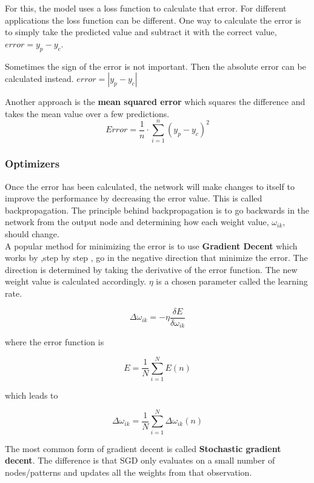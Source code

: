 For this, the model uses a loss function to calculate that error. For different applications the loss function can be different.
One way to calculate the error is to simply take the predicted value and subtract it with the correct value, $ error = y_p - y_c $.

Sometimes the sign of the error is not important. Then the absolute error can be calculated instead. $error = |y_p - y_c| $

Another approach is the \textbf{mean squared error} which squares the difference and takes the mean value over a few predictions.
\[Error = \frac{1}{n} \cdot \displaystyle\sum_{i=1}^{n} (y_p - y_c)^{2} \]


\subsubsection{Optimizers}
Once the error has been calculated, the network will make changes to itself to improve the performance by decreasing the error value. This is called backpropagation.
The principle behind backpropagation is to go backwards in the network from the output node and determining how each weight value, $ \omega_{ik} $, should change.\\

A popular method for minimizing the error is to use \textbf{Gradient Decent} which works by ,step by step , go in the negative direction that minimize the error.
The direction is determined by taking the derivative of the error function.
The new weight value is calculated accordingly. $\eta$ is a chosen parameter called the learning rate.

\[ \Delta \omega_{ik} = -\eta \frac{\delta E}{\delta \omega_{ik}} \]

\begin{center}
where the error function is
\end{center}

\[E = \frac{1}{N} \displaystyle\sum_{i=1}^{N} E(n) \]

\begin{center}
which leads to
\end{center}

\[ \Delta\omega_{ik} = \frac{1}{N}  \displaystyle\sum_{i=1}^{N} \Delta\omega_{ik}(n) \]

The most common form of gradient decent is called \textbf{Stochastic gradient decent}.
The difference is that SGD only evaluates on a small number of nodes/patterns and updates all the weights from that observation.


